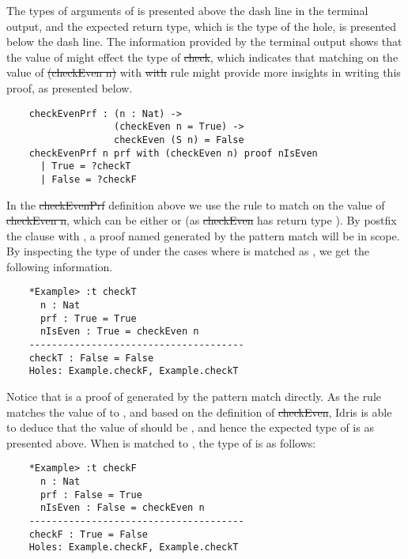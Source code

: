 The types of arguments of  is presented above the dash line in the terminal output, and the expected return type, which is the type of the  hole, is presented below the dash line. The information provided by the terminal output shows that the value of  might effect the type of \st{check}, which indicates that matching on the value of \st{(checkEven n)} with \st{with} rule might provide more insights in writing this proof, as presented below. 
\begin{lstlisting}
    checkEvenPrf : (n : Nat) -> 
                   (checkEven n = True) -> 
                   checkEven (S n) = False
    checkEvenPrf n prf with (checkEven n) proof nIsEven
      | True = ?checkT
      | False = ?checkF
\end{lstlisting}

In the \st{checkEvenPrf} definition above we use the  rule to match on the value of \st{checkEven n}, which can be either  or  (as \st{checkEven} has return type ). By postfix the  clause with , a proof named  generated by the pattern match will be in scope. By inspecting the type of  under the cases where  is matched as , we get the following information. 
\begin{lstlisting}
    *Example> :t checkT
      n : Nat
      prf : True = True
      nIsEven : True = checkEven n
    --------------------------------------
    checkT : False = False
    Holes: Example.checkF, Example.checkT
\end{lstlisting}

Notice that  is a proof of  generated by the pattern match directly. As the  rule matches the value of  to , and based on the definition of \st{checkEven}, Idris is able to deduce that the value of  should be , and hence the expected type of  is  as presented above. When  is matched to , the type of  is as follows: 
\begin{lstlisting}
    *Example> :t checkF
      n : Nat
      prf : False = True
      nIsEven : False = checkEven n
    --------------------------------------
    checkF : True = False
    Holes: Example.checkF, Example.checkT
\end{lstlisting}

